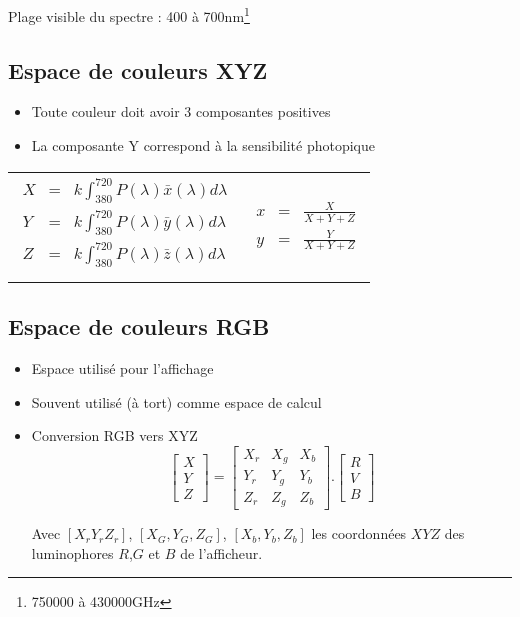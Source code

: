 \documentclass[12pt,a4paper,openany]{book}
\begin{document}
	Plage visible du spectre : 400 à 700nm\footnote{750000 à 430000GHz}

	\subsection{Espace de couleurs XYZ}
	\begin{itemize}
		\item Toute couleur doit avoir 3 composantes positives
		\item La composante Y correspond à la sensibilité photopique
	\end{itemize}

	\begin{tabular}{l r}
		\begin{minipage}{0.5\linewidth}
\begin{eqnarray*}
	X &=& k\int^{720}_{380} P(\lambda)\bar x(\lambda)d\lambda\\
	Y &=& k\int^{720}_{380} P(\lambda)\bar y(\lambda)d\lambda\\
	Z &=& k\int^{720}_{380} P(\lambda)\bar z(\lambda)d\lambda\\
\end{eqnarray*}
		\end{minipage}
		&
		\begin{minipage}{0.3\linewidth}
\begin{eqnarray*}
	x &=& \frac{X}{X+Y+Z}\\
	y &=& \frac{Y}{X+Y+Z}
\end{eqnarray*}
		\end{minipage}
	\end{tabular}

	\subsection{Espace de couleurs RGB}
	\begin{itemize}
		\item Espace utilisé pour l'affichage
		\item Souvent utilisé (à tort) comme espace de calcul
		\item Conversion RGB vers XYZ
			\begin{displaymath}
				\left[\begin{array}{c}X\\Y\\Z\end{array}\right]
					 =
				\left[ \begin{array}{ccc}
					X_r & X_{g} & X_b \\
					Y_r & Y_{g} & Y_b \\
					Z_r & Z_g & Z_b
				\end{array} \right]
				.
				\left[
				\begin{array}{c}
					R\\V\\B
				\end{array}
				\right]
			\end{displaymath}

			Avec $[X_rY_rZ_r]$, $[X_G,Y_G,Z_G]$, $[X_b,Y_b,Z_b]$ les coordonnées $XYZ$ des luminophores $R$,$G$ et $B$ de l'afficheur.
	\end{itemize}
\end{document}
